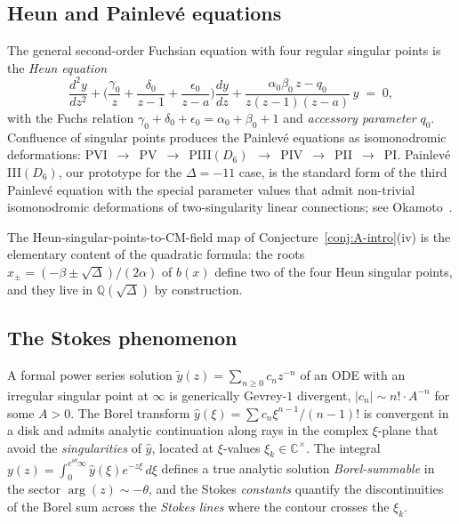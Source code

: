 \documentclass[11pt,reqno]{amsart}
\theoremstyle{definition}
\begin{document}
\subsection{Heun and Painlev\'e equations}\label{ssec:heun}

The general second-order Fuchsian equation with four regular
singular points is the \emph{Heun equation}
\begin{equation}\label{eq:heun}
\frac{d^{2}y}{dz^{2}}
+\Big(\frac{\gamma_{0}}{z}+\frac{\delta_{0}}{z-1}+\frac{\epsilon_{0}}{z-a}\Big)
\frac{dy}{dz}
+\frac{\alpha_{0}\beta_{0}\,z-q_{0}}{z(z-1)(z-a)}\,y
\;=\;0,
\end{equation}
with the Fuchs relation
$\gamma_{0}+\delta_{0}+\epsilon_{0}=\alpha_{0}+\beta_{0}+1$ and
\emph{accessory parameter} $q_{0}$. Confluence of singular points
produces the Painlev\'e equations as isomonodromic deformations:
PVI~$\to$~PV~$\to$~PIII$(D_{6})$~$\to$~PIV~$\to$~PII~$\to$~PI.
Painlev\'e III$(D_{6})$, our prototype for the
$\Delta=-11$ case, is the standard form of the third Painlev\'e
equation with the special parameter values that admit
non-trivial isomonodromic deformations of two-singularity
linear connections; see Okamoto~\cite{Okamoto1987}.

The Heun-singular-points-to-CM-field map of
Conjecture~\ref{conj:A-intro}(iv) is the elementary content of
the quadratic formula: the roots
$x_{\pm} = (-\beta\pm\sqrt{\Delta})/(2\alpha)$ of $b(x)$ define
two of the four Heun singular points, and they live in
$\mathbb{Q}(\sqrt{\Delta})$ by construction.

\subsection{The Stokes phenomenon}\label{ssec:stokes-bg}

A formal power series solution
$\widetilde{y}(z) = \sum_{n\ge 0} c_{n} z^{-n}$ of an ODE with
an irregular singular point at $\infty$ is generically Gevrey-$1$
divergent, $|c_{n}|\sim n!\cdot A^{-n}$ for some $A>0$. The
Borel transform $\widehat{y}(\xi) = \sum c_{n}\xi^{n-1}/(n-1)!$
is convergent in a disk and admits analytic continuation along
rays in the complex $\xi$-plane that avoid the
\emph{singularities} of $\widehat{y}$, located at $\xi$-values
$\xi_{k}\in\mathbb{C}^{\times}$. The integral
$y(z) = \int_{0}^{e^{i\theta}\infty} \widehat{y}(\xi) e^{-z\xi}\,d\xi$
defines a true analytic solution \emph{Borel-summable} in the
sector $\arg(z)\sim -\theta$, and the Stokes \emph{constants}
quantify the discontinuities of the Borel sum across the
\emph{Stokes lines} where the contour crosses the $\xi_{k}$.
\end{document}
